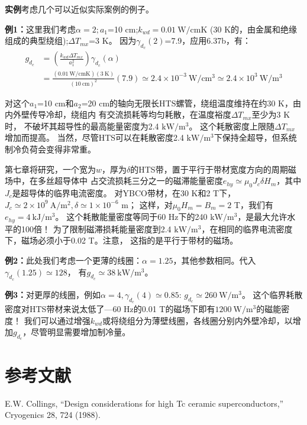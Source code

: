\textbf{实例}\quad 考虑几个可以近似实际案例的例子。

\textbf{例1：}\quad 这里我们考虑$\alpha=2;a_1$=10 cm;$k_{wd}=0.01\ \mathrm{W/cm K}$
(30 K的，由金属和绝缘组成的典型绕组);$\Delta T_{mx}$=3 K。
因为$\gamma_{d_c}(2)$=7.9，应用6.37b，有：
\begin{align*}%
g_{d_c}&=(\frac{k_{wd}\Delta T_{mx}}{a_1^2})\gamma_{d_c}(\alpha)\\\tag{6.37b}
&=\frac{(0.01\ \mathrm{W/cmK})(3\ \mathrm{K})}{(10\ \mathrm{cm})^2}(7.9)\simeq 2.4\times 10^{-3}\ \mathrm{W/cm^3}\simeq 2.4\times 10^3\ \mathrm{W/m^3}
\end{align*}

对这个$a_1$=10 cm和$a_2$=20 cm的轴向无限长HTS螺管，绕组温度维持在约30 K，由内外壁传导冷却，绕组内
有交流损耗等均匀耗散，在温度裕度$\Delta T_{mx}$至少为3 K时，
不破坏其超导性的最高能量密度为2.4 $\mathrm{kW/m^3}$。
这个耗散密度上限随$\Delta T_{mx}$增加而提高。
当然，尽管HTS可以在耗散密度2.4 $\mathrm{kW/m^3}$下保持全超导，但系统制冷负荷会变得非常重。

第七章将研究，一个宽为$w$，厚为$\delta$的HTS带，置于平行于带材宽度方向的周期磁场中，在多丝超导体中
占交流损耗三分之一的磁滞能量密度$e_{hy}\simeq\mu_0 J_c \delta H_m$，其中$J_c$是超导体的临界电流密度。
对YBCO带材，在30 K和2 T下，$J_c\simeq 2\times 10^9\ \mathrm{A/m^2},\delta\simeq 1\times 10^{-6}$ m；
这样，对$\mu_0 H_m=B_m=2$ T，我们有$e_{hy}=4\ \mathrm{kJ/m^3}$。
这个耗散能量密度等同于60 Hz下的240 $\mathrm{kW/m^3}$，是最大允许水平的100倍！
为了限制磁滞损耗能量密度到2.4 $\mathrm{kW/m^3}$，在相同的临界电流密度下，磁场必须小于0.02 T。注意，
这指的是平行于带材的磁场。


\textbf{例2：}\quad 此处我们考虑一个更薄的线圈：$\alpha=1.25$，其他参数相同。代入$\gamma_{d_c}(1.25)\simeq 128$，
有$g_{d_c}\simeq 38\ \mathrm{kW/m^3}$。

\textbf{例3：}\quad 对更厚的线圈，例如$\alpha=4,\gamma_{d_c}(4)\simeq 0.85$:
$g_{d_c}\simeq 260\ \mathrm{W/m^3}$。
这个临界耗散密度对HTS带材来说太低了---60 Hz的0.01 T的磁场下即有$1200\ \mathrm{W/m^3}$的磁能密度！
我们可以通过增强$k_{wd}$或将绕组分为薄壁线圈，各线圈分别内外壁冷却，以增加$g_{d_c}$，尽管明显需要增加制冷量。

\section*{参考文献}
\noindent [6.1] E.W. Collings, ``Design considerations for high Tc ceramic superconductors,” Cryogenics 28, 724 (1988).

